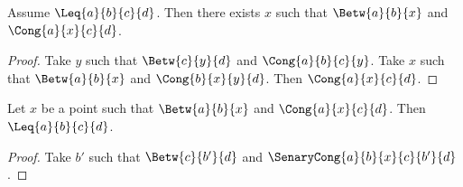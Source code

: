 \documentclass[10pt,a4paper,parskip=half,numbers=endperiod,parskip]{scrartcl}
\begin{document}
  \begin{forthel}
    \begin{lemma} %
      Assume $\Leq{a}{b}{c}{d}$.
      Then there exists $x$ such that $\Betw{a}{b}{x}$ and $\Cong{a}{x}{c}{d}$.
    \end{lemma}
    \begin{proof}
        Take $y$ such that $\Betw{c}{y}{d}$ and $\Cong{a}{b}{c}{y}$.
        Take $x$ such that $\Betw{a}{b}{x}$ and $\Cong{b}{x}{y}{d}$.
        Then $\Cong{a}{x}{c}{d}$.
    \end{proof}
  \end{forthel}


  \begin{forthel}
    \begin{lemma} %
      Let $x$ be a point such that $\Betw{a}{b}{x}$ and $\Cong{a}{x}{c}{d}$.
      Then $\Leq{a}{b}{c}{d}$.
    \end{lemma}
    \begin{proof}
      Take $b'$ such that $\Betw{c}{b'}{d}$ and $\SenaryCong{a}{b}{x}{c}{b'}{d}$.
    \end{proof}
  \end{forthel}
\end{document}

